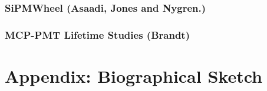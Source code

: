 \documentclass[11pt,english]{article}
\def\overhead#1{\part{#1}}
\def\onehead#1{\section{#1}}
\begin{document}



\onehead{SiPMWheel (Asaadi, Jones and Nygren.)}

%

\onehead{MCP-PMT Lifetime Studies (Brandt)}


\newpage


%
\newpage

\overhead{Appendix: Biographical Sketch}



















\newpage
\end{document}
